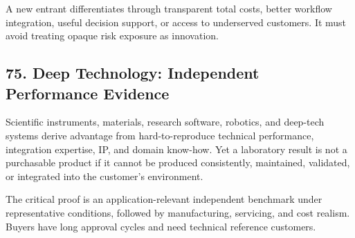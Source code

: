 A new entrant differentiates through transparent total costs, better workflow integration, useful decision support, or access to underserved customers. It must avoid treating opaque risk exposure as innovation.

\subsection*{75. Deep Technology: Independent Performance Evidence}

Scientific instruments, materials, research software, robotics, and deep-tech systems derive advantage from hard-to-reproduce technical performance, integration expertise, IP, and domain know-how. Yet a laboratory result is not a purchasable product if it cannot be produced consistently, maintained, validated, or integrated into the customer's environment.

The critical proof is an application-relevant independent benchmark under representative conditions, followed by manufacturing, servicing, and cost realism. Buyers have long approval cycles and need technical reference customers.
